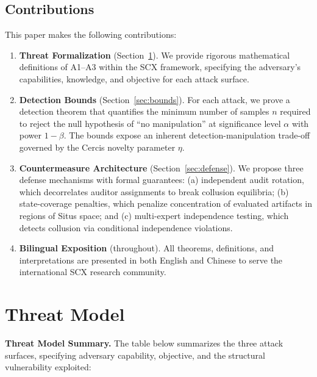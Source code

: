\documentclass[11pt,a4paper]{article}
\theoremstyle{plain}
\theoremstyle{definition}
\theoremstyle{remark}
\begin{document}
\subsection{Contributions}
This paper makes the following contributions:
\begin{enumerate}[label=\textbf{C\arabic*}, leftmargin=*]
  \item \textbf{Threat Formalization} (Section~\ref{sec:threat}). We provide rigorous
        mathematical definitions of A1--A3 within the SCX framework, specifying the
        adversary's capabilities, knowledge, and objective for each attack surface.
  \item \textbf{Detection Bounds} (Section~\ref{sec:bounds}). For each attack, we prove
        a detection theorem that quantifies the minimum number of samples \(n\) required to
        reject the null hypothesis of ``no manipulation'' at significance level \(\alpha\)
        with power \(1-\beta\). The bounds expose an inherent detection-manipulation
        trade-off governed by the Cercis novelty parameter \(\eta\).
  \item \textbf{Countermeasure Architecture} (Section~\ref{sec:defense}). We propose
        three defense mechanisms with formal guarantees:
        (a) independent audit rotation, which decorrelates auditor assignments to break
        collusion equilibria; (b) state-coverage penalties, which penalize concentration
        of evaluated artifacts in regions of Situs space; and (c) multi-expert
        independence testing, which detects collusion via conditional independence
        violations.
  \item \textbf{Bilingual Exposition} (throughout). All theorems, definitions, and
        interpretations are presented in both English and Chinese to serve the
        international SCX research community.
\end{enumerate}


\section{Threat Model}
\label{sec:threat}
\noindent
\textbf{Threat Model Summary.} The table below summarizes the three attack surfaces, specifying adversary capability, objective, and the structural vulnerability exploited:
\end{document}

